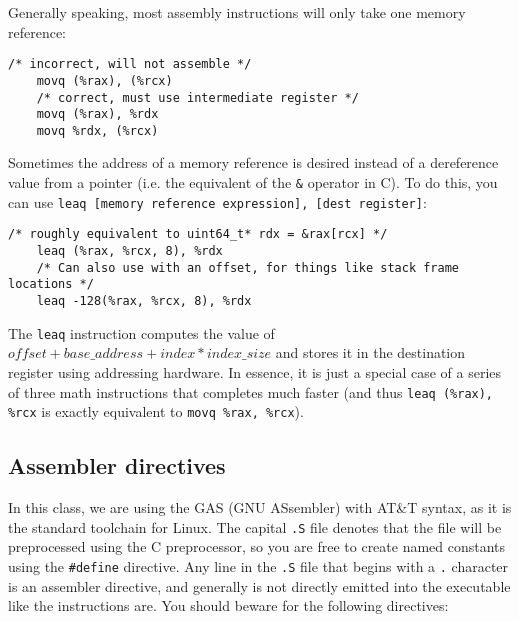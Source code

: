 \documentclass[11pt]{article}
\begin{document}
Generally speaking, most assembly instructions will only take one memory reference:

\begin{lstlisting}[caption={Using multiple memory references correctly}]
    /* incorrect, will not assemble */
    movq (%rax), (%rcx)
    /* correct, must use intermediate register */
    movq (%rax), %rdx
    movq %rdx, (%rcx)
\end{lstlisting}

Sometimes the address of a memory reference is desired instead of a dereference value from
a pointer (i.e. the equivalent of the \texttt{\&} operator in C). To do this, you can use
\texttt{leaq [memory reference expression], [dest register]}:

\begin{lstlisting}[caption={\texttt{leaq} instruction example}]
    /* roughly equivalent to uint64_t* rdx = &rax[rcx] */
    leaq (%rax, %rcx, 8), %rdx
    /* Can also use with an offset, for things like stack frame locations */
    leaq -128(%rax, %rcx, 8), %rdx
\end{lstlisting}

The \texttt{leaq} instruction computes the value of $offset + base\_address + index *
index\_size$ and stores it in the destination register using addressing hardware. In
essence, it is just a special case of a series of three math instructions that completes
much faster (and thus \texttt{leaq (\%rax), \%rcx} is exactly equivalent to \texttt{movq
\%rax, \%rcx}).

\subsection{Assembler directives}

In this class, we are using the GAS (GNU ASsembler) with AT\&T syntax, as it is the
standard toolchain for Linux. The capital \texttt{.S} file denotes that the file will be
preprocessed using the C preprocessor, so you are free to create named constants using the
\texttt{\#define} directive. Any line in the \texttt{.S} file that begins with a \texttt{.}
character is an assembler directive, and generally is not directly emitted into the
executable like the instructions are. You should beware for the following directives:
\end{document}
